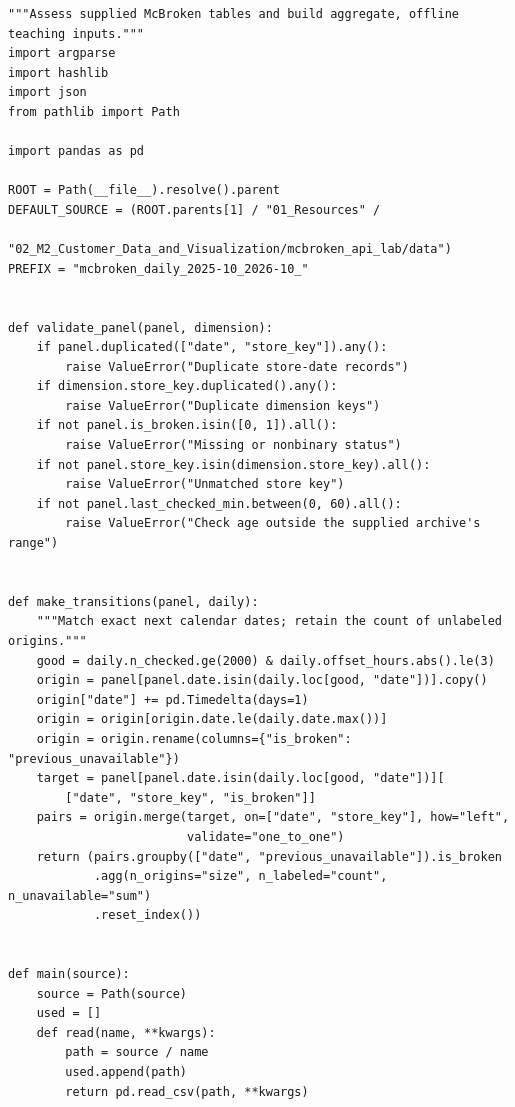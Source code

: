 \begin{Verbatim}[breaklines,breakanywhere,fontsize=\small]
"""Assess supplied McBroken tables and build aggregate, offline teaching inputs."""
import argparse
import hashlib
import json
from pathlib import Path

import pandas as pd

ROOT = Path(__file__).resolve().parent
DEFAULT_SOURCE = (ROOT.parents[1] / "01_Resources" /
                  "02_M2_Customer_Data_and_Visualization/mcbroken_api_lab/data")
PREFIX = "mcbroken_daily_2025-10_2026-10_"


def validate_panel(panel, dimension):
    if panel.duplicated(["date", "store_key"]).any():
        raise ValueError("Duplicate store-date records")
    if dimension.store_key.duplicated().any():
        raise ValueError("Duplicate dimension keys")
    if not panel.is_broken.isin([0, 1]).all():
        raise ValueError("Missing or nonbinary status")
    if not panel.store_key.isin(dimension.store_key).all():
        raise ValueError("Unmatched store key")
    if not panel.last_checked_min.between(0, 60).all():
        raise ValueError("Check age outside the supplied archive's range")


def make_transitions(panel, daily):
    """Match exact next calendar dates; retain the count of unlabeled origins."""
    good = daily.n_checked.ge(2000) & daily.offset_hours.abs().le(3)
    origin = panel[panel.date.isin(daily.loc[good, "date"])].copy()
    origin["date"] += pd.Timedelta(days=1)
    origin = origin[origin.date.le(daily.date.max())]
    origin = origin.rename(columns={"is_broken": "previous_unavailable"})
    target = panel[panel.date.isin(daily.loc[good, "date"])][
        ["date", "store_key", "is_broken"]]
    pairs = origin.merge(target, on=["date", "store_key"], how="left",
                         validate="one_to_one")
    return (pairs.groupby(["date", "previous_unavailable"]).is_broken
            .agg(n_origins="size", n_labeled="count", n_unavailable="sum")
            .reset_index())


def main(source):
    source = Path(source)
    used = []
    def read(name, **kwargs):
        path = source / name
        used.append(path)
        return pd.read_csv(path, **kwargs)


\end{Verbatim}
